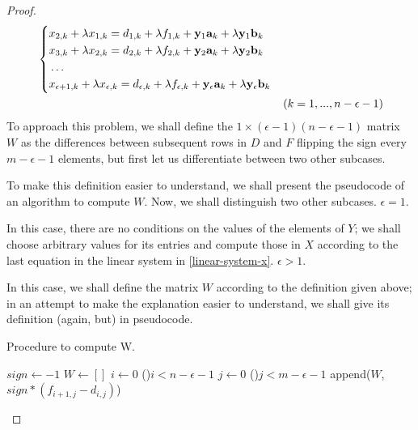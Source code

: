\begin{cs}
\begin{proof}
\begin{equation}
            \begin{aligned}
            & \left\{
                \begin{aligned}
                    & x_{2, k} + \lambda x_{1, k} = d_{1, k} + \lambda f_{1, k} + \vb{y}_{1}\vb{a}_{k} +
                        \lambda \vb{y}_{1}\vb{b}_{k} \\
                    & x_{3, k} + \lambda x_{2, k} = d_{2, k} + \lambda f_{2, k} + \vb{y}_{2}\vb{a}_{k} +
                        \lambda \vb{y}_{2}\vb{b}_{k} \\
                    & \hdots \\
                    & x_{\epsilon+1, k} + \lambda x_{\epsilon, k} =
                        d_{\epsilon, k} + \lambda f_{\epsilon, k} + \vb{y}_{\epsilon}\vb{a}_{k} +
                        \lambda \vb{y}_{\epsilon}\vb{b}_{k} \\
                \end{aligned}
            \right. \\
            & & (k = 1, ..., n - \epsilon - 1)
        \end{aligned}
        \end{equation}
        To approach this problem, we shall define the \(1 \times (\epsilon - 1)(n - \epsilon - 1)\) matrix \(W\) as the differences between
        subsequent rows in \(D\) and \(F\) flipping the sign every \(m - \epsilon - 1\) elements, but first let us
        differentiate between two other subcases.
        
        To make this definition easier to understand, we shall present the pseudocode of an algorithm to compute \(W\).
        Now, we shall distinguish two other subcases.
        \subcase \(\epsilon = 1.\)

            In this case, there are no conditions on the values of the elements of \(Y\); we shall choose arbitrary values
            for its entries and compute those in \(X\) according to the last equation in the linear
            system in \eqref{linear-system-x}.
        \subcase \(\epsilon > 1.\)

        In this case, we shall define the matrix \(W\) according to the definition given above; in an attempt to make
        the explanation easier to understand, we shall give its definition (again, but) in pseudocode.

        \begin{algorithm*}
            \caption{Procedure to compute W.}
            $sign \gets -1$\;
            $W \gets []$\;
            $i \gets 0$\;
            \For(){$i < n - \epsilon - 1$}{
                $j \gets 0$\;
                \For(){$j < m - \epsilon - 1$}{
                    append($W$, $sign * (f_{i+1, j} - d_{i, j})$)\;
                }
            }
        \end{algorithm*}


\end{proof}
\end{cs}
